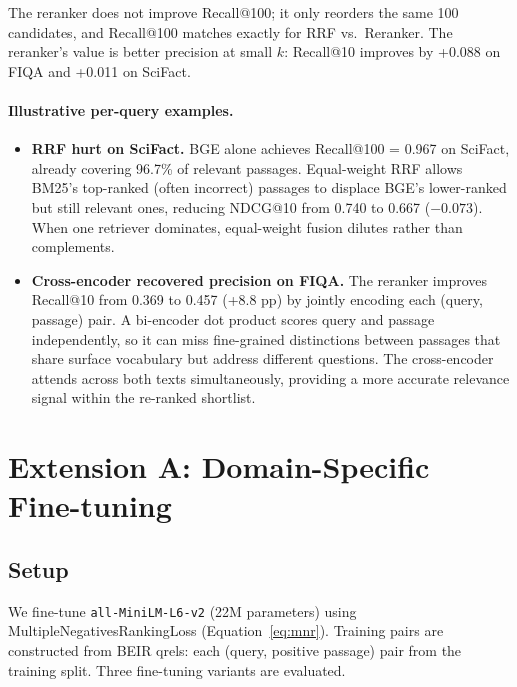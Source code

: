\documentclass[12pt, a4paper]{article}
\makeatletter
\newcommand{\ndcg}{NDCG@10}
\newcommand{\fiqa}{FIQA}
\newcommand{\scifact}{SciFact}
\makeatother
\begin{document}
The reranker does not improve Recall@100; it only reorders the same
100 candidates, and Recall@100 matches exactly for RRF vs.\ Reranker.
The reranker's value is better precision at small $k$: Recall@10 improves
by +0.088 on \fiqa{} and +0.011 on \scifact{}.

\paragraph{Illustrative per-query examples.}
\begin{itemize}
  \item \textbf{RRF hurt on \scifact{}.}  BGE alone achieves Recall@100 = 0.967
        on \scifact{}, already covering 96.7\% of relevant passages.
        Equal-weight RRF allows BM25's top-ranked (often incorrect) passages
        to displace BGE's lower-ranked but still relevant ones, reducing
        \ndcg{} from 0.740 to 0.667 ($-0.073$).  When one retriever dominates,
        equal-weight fusion dilutes rather than complements.
  \item \textbf{Cross-encoder recovered precision on \fiqa{}.}  The reranker
        improves Recall@10 from 0.369 to 0.457 (+8.8 pp) by jointly encoding
        each (query, passage) pair.  A bi-encoder dot product scores query
        and passage independently, so it can miss fine-grained distinctions
        between passages that share surface vocabulary but address different
        questions.  The cross-encoder attends across both texts simultaneously,
        providing a more accurate relevance signal within the re-ranked shortlist.
\end{itemize}

\section{Extension A: Domain-Specific Fine-tuning}
\label{sec:finetune}

\subsection{Setup}

We fine-tune \texttt{all-MiniLM-L6-v2} (22M parameters) using
MultipleNegativesRankingLoss (Equation~\ref{eq:mnr}).  Training pairs are
constructed from BEIR qrels: each (query, positive passage) pair from the
training split.  Three fine-tuning variants are evaluated.
\end{document}

